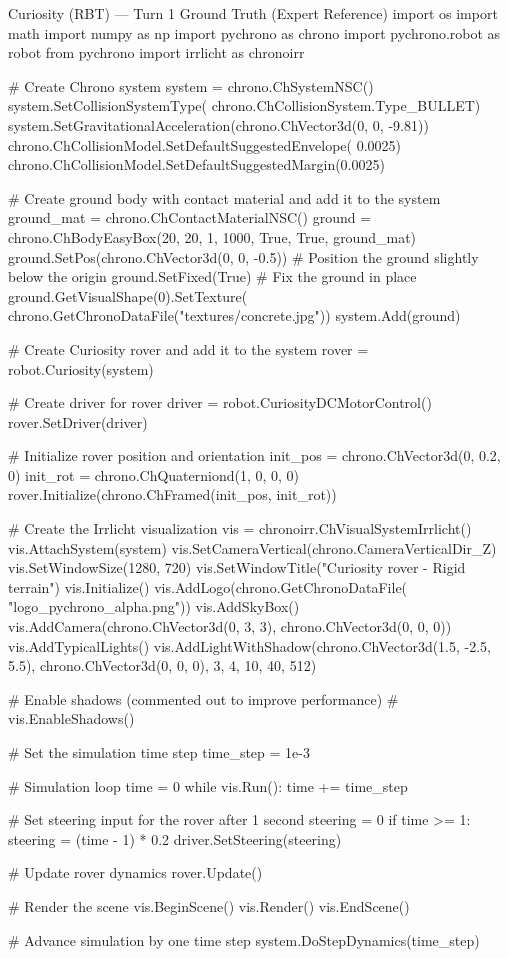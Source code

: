 \begin{CodeBlock}{Curiosity (RBT) --- Turn 1 Ground Truth (Expert Reference)}
import os
import math
import numpy as np
import pychrono as chrono
import pychrono.robot as robot
from pychrono import irrlicht as chronoirr

# Create Chrono system
system = chrono.ChSystemNSC()
system.SetCollisionSystemType(
    chrono.ChCollisionSystem.Type_BULLET)
system.SetGravitationalAcceleration(chrono.ChVector3d(0, 0, -9.81))
chrono.ChCollisionModel.SetDefaultSuggestedEnvelope(
    0.0025)
chrono.ChCollisionModel.SetDefaultSuggestedMargin(0.0025)

# Create ground body with contact material and add it to the system
ground_mat = chrono.ChContactMaterialNSC()
ground = chrono.ChBodyEasyBox(20, 20, 1, 1000, True, True, ground_mat)
ground.SetPos(chrono.ChVector3d(0, 0, -0.5))  # Position the ground slightly below the origin
ground.SetFixed(True)  # Fix the ground in place
ground.GetVisualShape(0).SetTexture(
    chrono.GetChronoDataFile("textures/concrete.jpg"))
system.Add(ground)

# Create Curiosity rover and add it to the system
rover = robot.Curiosity(system)

# Create driver for rover
driver = robot.CuriosityDCMotorControl()
rover.SetDriver(driver)

# Initialize rover position and orientation
init_pos = chrono.ChVector3d(0, 0.2, 0)
init_rot = chrono.ChQuaterniond(1, 0, 0, 0)
rover.Initialize(chrono.ChFramed(init_pos, init_rot))

# Create the Irrlicht visualization
vis = chronoirr.ChVisualSystemIrrlicht()
vis.AttachSystem(system)
vis.SetCameraVertical(chrono.CameraVerticalDir_Z)
vis.SetWindowSize(1280, 720)
vis.SetWindowTitle("Curiosity rover - Rigid terrain")
vis.Initialize()
vis.AddLogo(chrono.GetChronoDataFile(
    "logo_pychrono_alpha.png"))
vis.AddSkyBox()
vis.AddCamera(chrono.ChVector3d(0, 3, 3), chrono.ChVector3d(0, 0, 0))
vis.AddTypicalLights()
vis.AddLightWithShadow(chrono.ChVector3d(1.5, -2.5, 5.5), chrono.ChVector3d(0, 0, 0), 3, 4, 10, 40, 512)

# Enable shadows (commented out to improve performance)
# vis.EnableShadows()

# Set the simulation time step
time_step = 1e-3

# Simulation loop
time = 0
while vis.Run():
    time += time_step

    # Set steering input for the rover after 1 second
    steering = 0
    if time >= 1:
        steering = (time - 1) * 0.2
    driver.SetSteering(steering)

    # Update rover dynamics
    rover.Update()

    # Render the scene
    vis.BeginScene()
    vis.Render()
    vis.EndScene()

    # Advance simulation by one time step
    system.DoStepDynamics(time_step)
\end{CodeBlock}

